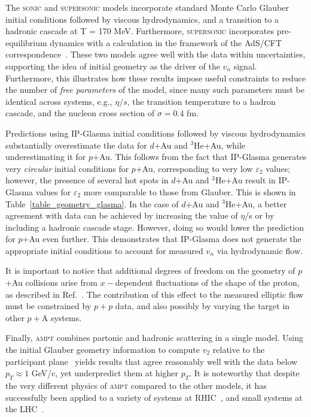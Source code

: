 \documentclass[%
reprint,
showpacs,preprintnumbers,
 amsmath,amssymb,
 aps,
]{revtex4-1}
\newcommand{\pt}{\mbox{$p_T$}\xspace}
\newcommand{\dau}{\mbox{$d$+Au}\xspace}
\newcommand{\pau}{\mbox{$p$+Au}\xspace}
\newcommand{\hau}{\mbox{$^3\text{He}$+Au}\xspace}
\begin{document}
The \textsc{sonic} and \textsc{supersonic} models incorporate standard Monte Carlo Glauber initial conditions followed by viscous hydrodynamics, and a transition to a hadronic cascade at T = 170 MeV. Furthermore, \textsc{supersonic} incorporates pre-equilibrium dynamics with a calculation in the framework of the AdS/CFT correspondence~\cite{vanderSchee:2013pia,Chesler:2015wra,Romatschke:2013re}. These two models agree well with the data within uncertainties, supporting the idea of initial geometry as the driver of the $v_n$ signal. Furthermore, this illustrates how these results impose useful constraints to reduce the number of \emph{free parameters} of the model, since many such parameters must be identical across systems, e.g., $\eta/s$, the transition temperature to a hadron cascade, and the nucleon cross section of $\sigma=0.4$ fm.

Predictions using IP-Glasma initial conditions followed by viscous hydrodynamics substantially overestimate the data for \dau and \hau, while underestimating it for \pau. This follows from the fact that IP-Glasma generates very \emph{circular} initial conditions for \pau, corresponding to very low $\varepsilon_2$ values; however, the presence of several hot spots in \dau and \hau result in IP-Glasma values for $\varepsilon_2$ more comparable to those from Glauber. This is shown in Table~\ref{table_geometry_glasma}. In the case of \dau and \hau, a better agreement with data can be achieved by increasing the value of $\eta$/s or by including a hadronic cascade stage. However, doing so would lower the prediction for \pau even further. This demonstrates that IP-Glasma does not generate the appropriate initial conditions to account for measured $v_n$ via hydrodynamic flow. 

It is important to notice that additional degrees of freedom on the geometry of \pau collisions arise from $x-$dependent fluctuations of the shape of the proton, as described in Ref.~\cite{Schlichting:2014ipa}. The contribution of this effect to the measured elliptic flow must be constrained by $p+p$ data, and also possibly by varying the target in other $p+$A systems.

Finally, \textsc{ampt} combines partonic and hadronic scattering in a single model. Using the initial Glauber geometry information to compute $v_2$ relative to the participant plane~\cite{Koop:2015wea} yields results that agree reasonably well with the data below $\pt \approx 1$ GeV/c, yet underpredict them at higher \pt. It is noteworthy that despite the very different physics of \textsc{ampt} compared to the other models, it has successfully been applied to a variety of systems at RHIC~\cite{Adare:2015cpn,Koop:2015wea}, and small systems at the LHC~\cite{ma_long-range_2014,ma_long-range_2014}.
\end{document}
